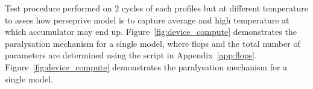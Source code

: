 %
Test procedure performed on 2 cycles of each profiles but at different temperature to asses how perseprive model is to capture average and high temperature at which accumulator may end up.
%
%
{
\mbox{Figure~\ref{fig:device_compute}} demonstrates the paralysation mechanism for a single model, where flops and the total number of parameters are determined using the script in Appendix~\ref{app:flops}.
}
{
\mbox{Figure~\ref{fig:device_compute}} demonstrates the paralysation mechanism for a single model.
}
